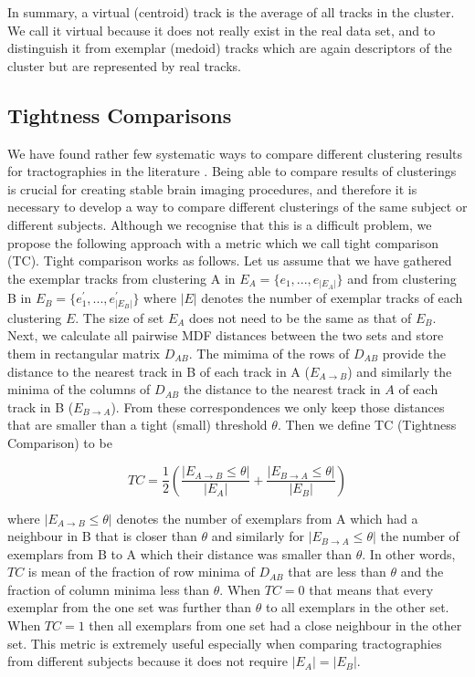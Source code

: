 \documentclass[journal]{IEEEtran}
\begin{document}
In summary, a virtual (centroid) track is the average of all tracks in
the cluster. We call it virtual because it does not really exist in the
real data set, and to distinguish it from exemplar (medoid) tracks which
are again descriptors of the cluster but are represented by real tracks.

\subsection{Tightness Comparisons\label{sub:Tightness-comparisons-1}}

We have found rather few systematic ways to compare different clustering
results for tractographies in the literature
\cite{moberts2005evaluation}.  Being able to compare results of
clusterings is crucial for creating stable brain imaging procedures, and
therefore it is necessary to develop a way to compare different
clusterings of the same subject or different subjects. Although we
recognise that this is a difficult problem, we propose the following
approach with a metric which we call tight comparison (TC). Tight
comparison works as follows. Let us assume that we have gathered the
exemplar tracks from clustering A in $E_{A}=\{e_{1},...,e_{|E_{A}|}\}$
and from clustering B in $E_{B}=\{e_{1}^{'},...,e_{|E_{B}|}^{'}\}$ where
$|E|$ denotes the number of exemplar tracks of each clustering $E$. The
size of set $E_{A}$ does not need to be the same as that of
$E_{B}$. Next, we calculate all pairwise MDF distances between the two
sets and store them in rectangular matrix $D_{AB}$. The mimima of the
rows of $D_{AB}$ provide the distance to the nearest track in B of each
track in A ($E_{A\rightarrow B}$) and similarly the minima of the
columns of $D_{AB}$ the distance to the nearest track in $A$ of each
track in B ($E_{B\rightarrow A}$). From these correspondences we only
keep those distances that are smaller than a tight (small) threshold
$\theta$. Then we define TC (Tightness Comparison) to be

\begin{equation}
TC=\frac{1}{2}\left(\frac{|E_{A\rightarrow B}\leq \theta |}{|E_{A}|}+\frac{|E_{B\rightarrow A}\leq \theta |}{|E_{B}|}\right)\label{eq:TC}
\end{equation}

\noindent where $|E_{A\rightarrow B}\leq \theta |$ denotes the number of
exemplars from A which had a neighbour in B that is closer than $\theta$
and similarly for $|E_{B\rightarrow A}\leq \theta |$ the number of
exemplars from B to A which their distance was smaller than
$\theta$. In other words, $TC$ is mean of the fraction of row minima of
$D_{AB}$ that are less than $\theta$ and the fraction of column minima
less than $\theta$.  When $TC=0$ that means that every exemplar from the
one set was further than $\theta$ to all exemplars in the other
set. When $TC=1$ then all exemplars from one set had a close neighbour
in the other set. This metric is extremely useful especially when
comparing tractographies from different subjects because it does not
require $|E_{A}|=|E_{B}|$.
\end{document}
